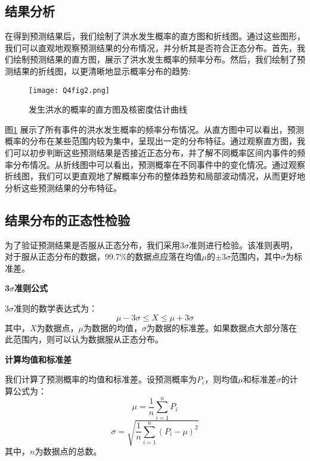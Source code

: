 \documentclass[withoutpreface,bwprint]{cumcmthesis} %
\begin{document}
\subsection{结果分析}
在得到预测结果后，我们绘制了洪水发生概率的直方图和折线图。通过这些图形，我们可以直观地观察预测结果的分布情况，并分析其是否符合正态分布。首先，我们绘制预测结果的直方图，展示了洪水发生概率的频率分布。然后，我们绘制了预测结果的折线图，以更清晰地显示概率分布的趋势:

\begin{figure}[htbp]
	\centering
	\texttt{[image: Q4fig2.png]}
	\caption{发生洪水的概率的直方图及核密度估计曲线}
	\label{fig:histogram}
\end{figure}

图\ref{fig:histogram}  展示了所有事件的洪水发生概率的频率分布情况。从直方图中可以看出，预测概率的分布在某些范围内较为集中，呈现出一定的分布特征。通过观察直方图，我们可以初步判断这些预测结果是否接近正态分布，并了解不同概率区间内事件的频率分布情况。从折线图中可以看出，预测概率在不同事件中的变化情况。通过观察折线图，我们可以更直观地了解概率分布的整体趋势和局部波动情况，从而更好地分析这些预测结果的分布特征。




\subsection{结果分布的正态性检验}
为了验证预测结果是否服从正态分布，我们采用3$\sigma$准则进行检验。该准则表明，对于服从正态分布的数据，99.7\%的数据点应落在均值$\mu$的$\pm3\sigma$范围内，其中$\sigma$为标准差。

\textbf{3$\sigma$准则公式}

3$\sigma$准则的数学表达式为：
\begin{equation}
\mu - 3\sigma \leq X \leq \mu + 3\sigma
\end{equation}
其中，$X$为数据点，$\mu$为数据的均值，$\sigma$为数据的标准差。如果数据点大部分落在此范围内，则可以认为数据服从正态分布。

\textbf{计算均值和标准差}

我们计算了预测概率的均值和标准差。设预测概率为$P_i$，则均值$\mu$和标准差$\sigma$的计算公式为：
\begin{equation}
\mu = \frac{1}{n} \sum_{i=1}^n P_i
\end{equation}
\begin{equation}
\sigma = \sqrt{\frac{1}{n} \sum_{i=1}^n (P_i - \mu)^2}
\end{equation}
其中，$n$为数据点的总数。
\end{document}

